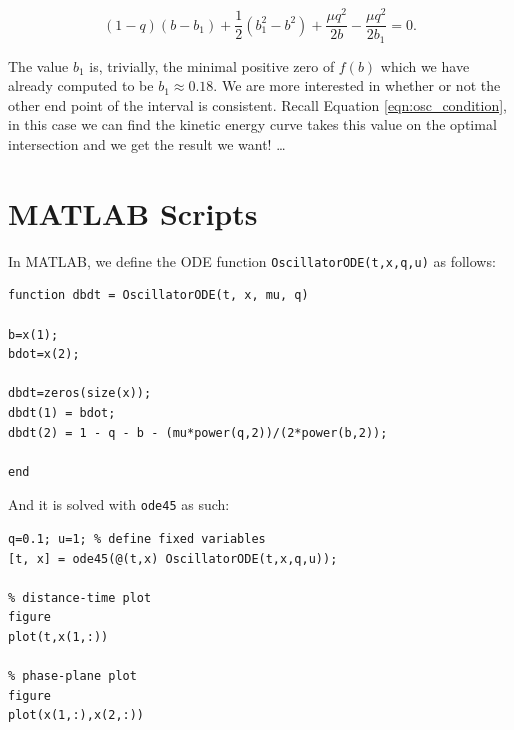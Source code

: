 \documentclass{article}
\begin{document}
\begin{equation}
    (1-q)(b-b_1) +\frac{1}{2}(b_1^2-b^2) + \frac{\mu q^2}{2b} - \frac{\mu q^2}{2b_1} = 0.
    \label{eqn:integral_curves_zeroes_explicit}
\end{equation}

The value $b_1$ is, trivially, the minimal positive zero of $f(b)$ which we have already computed to be $b_1 \approx 0.18$.
We are more interested in whether or not the other end point of the interval is consistent.
Recall Equation \ref{eqn:osc_condition}, in this case we can find the kinetic energy curve takes this value on the optimal intersection and we get the result we want! %
\dots













\appendix

\section{MATLAB Scripts}

In MATLAB, we define the ODE function \texttt{OscillatorODE(t,x,q,u)} as follows:


\begin{verbatim}
function dbdt = OscillatorODE(t, x, mu, q)

b=x(1);
bdot=x(2);

dbdt=zeros(size(x));
dbdt(1) = bdot;
dbdt(2) = 1 - q - b - (mu*power(q,2))/(2*power(b,2));

end
\end{verbatim}

And it is solved with \texttt{ode45} as such:

\begin{verbatim}
q=0.1; u=1; % define fixed variables
[t, x] = ode45(@(t,x) OscillatorODE(t,x,q,u));

% distance-time plot
figure
plot(t,x(1,:))

% phase-plane plot
figure
plot(x(1,:),x(2,:))
\end{verbatim}
\end{document}
